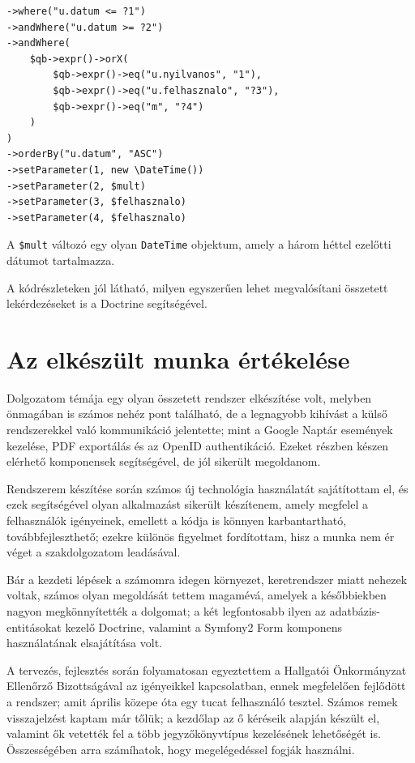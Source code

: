 \documentclass[a4paper,12pt,oneside]{report}
\begin{document}
\begin{lstlisting}
->where("u.datum <= ?1")
->andWhere("u.datum >= ?2")
->andWhere(
    $qb->expr()->orX(
        $qb->expr()->eq("u.nyilvanos", "1"),
        $qb->expr()->eq("u.felhasznalo", "?3"),
        $qb->expr()->eq("m", "?4")
    )
)
->orderBy("u.datum", "ASC")
->setParameter(1, new \DateTime())
->setParameter(2, $mult)
->setParameter(3, $felhasznalo)
->setParameter(4, $felhasznalo)
\end{lstlisting}

A {\tt \$mult} változó egy olyan {\tt DateTime} objektum, amely a három héttel ezelőtti dátumot tartalmazza.

A kódrészleteken jól látható, milyen egyszerűen lehet megvalósítani összetett lekérdezéseket is a Doctrine segítségével.

\section{Az elkészült munka értékelése}

Dolgozatom témája egy olyan összetett rendszer elkészítése volt, melyben önmagában is számos nehéz pont található, de a legnagyobb kihívást a külső rendszerekkel való kommunikáció jelentette; mint a Google Naptár események kezelése, PDF exportálás és az OpenID authentikáció. Ezeket részben készen elérhető komponensek segítségével, de jól sikerült megoldanom.

Rendszerem készítése során számos új technológia használatát sajátítottam el, és ezek segítségével olyan alkalmazást sikerült készítenem, amely megfelel a felhasználók igényeinek, emellett a kódja is könnyen karbantartható, továbbfejleszthető; ezekre különös figyelmet fordítottam, hisz a munka nem ér véget a szakdolgozatom leadásával.

Bár a kezdeti lépések a számomra idegen környezet, keretrendszer miatt nehezek voltak, számos olyan megoldását tettem magamévá, amelyek a későbbiekben nagyon megkönnyítették a dolgomat; a két legfontosabb ilyen az adatbázis-entitásokat kezelő Doctrine, valamint a Symfony2 Form komponens használatának elsajátítása volt.

A tervezés, fejlesztés során folyamatosan egyeztettem a Hallgatói Önkormányzat Ellenőrző Bizottságával az igényeikkel kapcsolatban, ennek megfelelően fejlődött a rendszer; amit április közepe óta egy tucat felhasználó tesztel. Számos remek visszajelzést kaptam már tőlük; a kezdőlap az ő kéréseik alapján készült el, valamint ők vetették fel a több jegyzőkönyvtípus kezelésének lehetőségét is. Összességében arra számíhatok, hogy megelégedéssel fogják használni.
\end{document}
